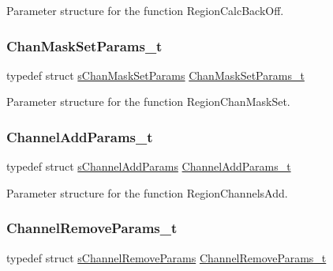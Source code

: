Parameter structure for the function Region\+Calc\+Back\+Off. \mbox{\label{group___r_e_g_i_o_n_ga6d24f7da136006410827dfb29f6b9b9e}} 
\subsubsection{\texorpdfstring{Chan\+Mask\+Set\+Params\+\_\+t}{ChanMaskSetParams\_t}}
{\footnotesize\ttfamily typedef struct \mbox{\hyperlink{structs_chan_mask_set_params}{s\+Chan\+Mask\+Set\+Params}} \mbox{\hyperlink{group___r_e_g_i_o_n_ga6d24f7da136006410827dfb29f6b9b9e}{Chan\+Mask\+Set\+Params\+\_\+t}}}

Parameter structure for the function Region\+Chan\+Mask\+Set. \mbox{\label{group___r_e_g_i_o_n_gab1c5f3aa06614283202906cef4417860}} 
\subsubsection{\texorpdfstring{Channel\+Add\+Params\+\_\+t}{ChannelAddParams\_t}}
{\footnotesize\ttfamily typedef struct \mbox{\hyperlink{structs_channel_add_params}{s\+Channel\+Add\+Params}} \mbox{\hyperlink{group___r_e_g_i_o_n_gab1c5f3aa06614283202906cef4417860}{Channel\+Add\+Params\+\_\+t}}}

Parameter structure for the function Region\+Channels\+Add. \mbox{\label{group___r_e_g_i_o_n_gaa37468560d2fc81a977b57a48e5d72c0}} 
\subsubsection{\texorpdfstring{Channel\+Remove\+Params\+\_\+t}{ChannelRemoveParams\_t}}
{\footnotesize\ttfamily typedef struct \mbox{\hyperlink{structs_channel_remove_params}{s\+Channel\+Remove\+Params}} \mbox{\hyperlink{group___r_e_g_i_o_n_gaa37468560d2fc81a977b57a48e5d72c0}{Channel\+Remove\+Params\+\_\+t}}}

